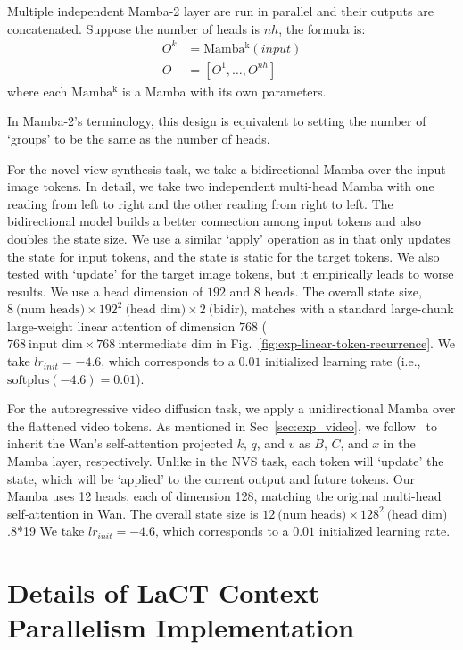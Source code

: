 \documentclass{article}
\begin{document}
Multiple independent Mamba-2 layer are run in parallel and their outputs are concatenated.
Suppose the number of heads is $\mathit{nh}$, the formula is:
\begin{align}
    O^k & = \mathrm{Mamba^k} (\mathit{input}) \nonumber \\
    O &= [O^1, \ldots, O^\mathit{nh}]
\end{align}
where each $\mathrm{Mamba^k}$ is a Mamba with its own parameters.

In Mamba-2's terminology, this design is equivalent to setting the number of `groups' to be the same as the number of heads.

For the novel view synthesis task, we take a bidirectional Mamba over the input image tokens.
In detail, we take two independent multi-head Mamba with one reading from left to right and the other reading from right to left.
The bidirectional model builds a better connection among input tokens and also doubles the state size.
We use a similar `apply' operation as in \methodname{} that only updates the state for input tokens, and the state is static for the target tokens.
We also tested with `update' for the target image tokens, but it empirically leads to worse results.
We use a head dimension of $192$ and $8$ heads.
The overall state size, $8~\text{(num heads)} \times 192^{2} ~\text{(head dim)} \times 2~\text{(bidir)}$, matches \methodname{} with a standard large-chunk large-weight linear attention of dimension $768$ ($768~\text{input dim} \times 768~\text{intermediate dim}$ in Fig.~\ref{fig:exp-linear-token-recurrence}.
We take $\mathit{lr}_\mathit{init}{=}-4.6$, which corresponds to a $0.01$ initialized learning rate (i.e., $\mathrm{softplus}(-4.6) = 0.01$).

For the autoregressive video diffusion task, we apply a unidirectional Mamba over the flattened video tokens. As mentioned in Sec~\ref{sec:exp_video}, we follow~\cite{wang2024mambainllama} to inherit the Wan's self-attention projected $k$, $q$, and $v$ as $B$, $C$, and $x$ in the Mamba layer, respectively. Unlike in the NVS task, each token will `update' the state, which will be `applied' to the current output and future tokens. Our Mamba uses 12 heads, each of dimension 128, matching the original multi-head self-attention in Wan. The overall state size is $12~\text{(num heads)} \times 128^{2} ~\text{(head dim)}$.8*19
We take $\mathit{lr}_\mathit{init}{=}-4.6$, which corresponds to a $0.01$ initialized learning rate.

\section{Details of LaCT Context Parallelism Implementation}
\end{document}
